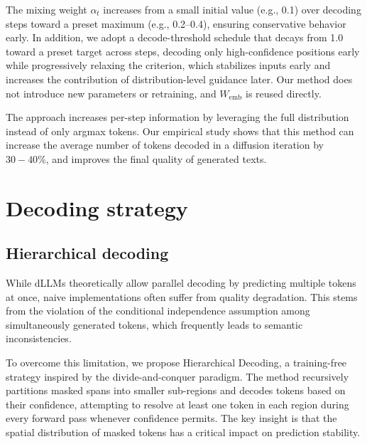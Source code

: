 \documentclass[]{antgroup}
\begin{document}
The mixing weight $\alpha_t$ increases from a small initial value (e.g., 0.1) over decoding steps toward a preset maximum (e.g., 0.2–0.4), ensuring conservative behavior early.
In addition, we adopt a decode-threshold schedule that decays from 1.0 toward a preset target across steps, decoding only high-confidence positions early while progressively relaxing the criterion, which stabilizes inputs early and increases the contribution of distribution-level guidance later. 
Our method does not introduce new parameters or retraining, and $W_{\mathrm{emb}}$ is reused directly.

The approach increases per-step information by leveraging the full distribution instead of only argmax tokens. Our empirical study shows that this method can increase the average number of tokens decoded in a diffusion iteration by $30-40\%$, and improves the final quality of generated texts. %


\section{Decoding strategy}

\subsection{Hierarchical decoding}
\label{sec:HD}
While dLLMs theoretically allow parallel decoding by predicting multiple tokens at once, naive implementations often suffer from quality degradation. This stems from the violation of the conditional independence assumption among simultaneously generated tokens, which frequently leads to semantic inconsistencies.

To overcome this limitation, we propose Hierarchical Decoding, a training-free strategy inspired by the divide-and-conquer paradigm. The method recursively partitions masked spans into smaller sub-regions and decodes tokens based on their confidence, attempting to resolve at least one token in each region during every forward pass whenever confidence permits. The key insight is that the spatial distribution of masked tokens has a critical impact on prediction stability.
\end{document}

